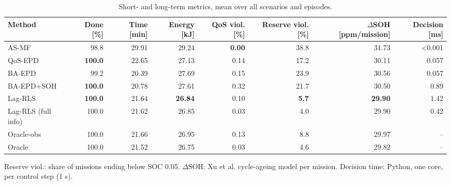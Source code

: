 \begin{table}[t]
\centering
\caption{Short- and long-term metrics, mean over all scenarios and episodes.}
\label{tab:metrics}
\footnotesize
\setlength{\tabcolsep}{4pt}
\begin{tabular}{lrrrrrrr}
\toprule
Method & Done [\%] & Time [min] & Energy [kJ] & QoS viol. [\%] & Reserve viol. [\%] & $\Delta$SOH [ppm/mission] & Decision [ms] \\
\midrule
AS-MF & 98.8 & 29.91 & 29.24 & \textbf{0.00} & 38.8 & 31.73 & <0.001 \\
QoS-EPD & \textbf{100.0} & 22.65 & 27.13 & 0.14 & 17.2 & 30.11 & 0.057 \\
BA-EPD & 99.2 & 20.39 & 27.69 & 0.15 & 23.9 & 30.56 & 0.057 \\
BA-EPD+SOH & \textbf{100.0} & 20.78 & 27.61 & 0.32 & 21.7 & 30.50 & 0.89 \\
\midrule
Lag-RLS & \textbf{100.0} & 21.64 & \textbf{26.84} & 0.10 & \textbf{5.7} & \textbf{29.90} & 1.42 \\
\midrule
Lag-RLS (full info) & 100.0 & 21.62 & 26.85 & 0.03 & 4.0 & 29.90 & 0.42 \\
Oracle-obs & 100.0 & 21.66 & 26.95 & 0.13 & 8.8 & 29.97 & – \\
Oracle & 100.0 & 21.52 & 26.75 & 0.03 & 4.6 & 29.82 & – \\
\bottomrule
\end{tabular}
\par\vspace{2pt}\parbox{\linewidth}{\scriptsize Reserve viol.: share of missions ending below SOC 0.05. $\Delta$SOH: Xu et al. cycle-ageing model per mission. Decision time: Python, one core, per control step (1 s).}
\end{table}
